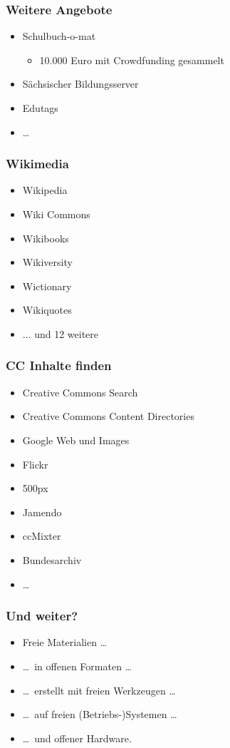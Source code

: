 \documentclass[table]{beamer}
\begin{document}
\begin{frame}
    \frametitle{Weitere Angebote}
    \begin{itemize}
        \item<2-> Schulbuch-o-mat
            \begin{itemize}
                \item<3-> 10.000 Euro mit Crowdfunding gesammelt
            \end{itemize}
        \item<4-> Sächsischer Bildungsserver
        \item<5-> Edutags
        \item<6-> \ldots
    \end{itemize}
\end{frame}

\begin{frame}
    \frametitle{Wikimedia}
    \begin{itemize}
      \item<2-> Wikipedia
      \item<3-> Wiki Commons
      \item<4-> Wikibooks
      \item<5-> Wikiversity
      \item<6-> Wictionary
      \item<7-> Wikiquotes
      \item<8-> ... und 12 weitere
    \end{itemize}
\end{frame}

\begin{frame}
    \frametitle{CC Inhalte finden}
    \begin{itemize}
        \item<2-> Creative Commons Search
        \item<3-> Creative Commons Content Directories
        \item<4-> Google Web und Images
        \item<5-> Flickr
        \item<6-> 500px
        \item<7-> Jamendo
        \item<8-> ccMixter
        \item<9-> Bundesarchiv
        \item<10-> \ldots
    \end{itemize}
\end{frame}

\begin{frame}
    \frametitle{Und weiter?}
    \begin{itemize}
      \item<2-> Freie Materialien \dots
      \item<3-> \dots~in offenen Formaten \dots
      \item<4-> \dots~erstellt mit freien Werkzeugen \dots
      \item<5-> \dots~auf freien (Betriebs-)Systemen \dots
      \item<6-> \dots~und offener Hardware.
    \end{itemize}
\end{frame}
\end{document}
